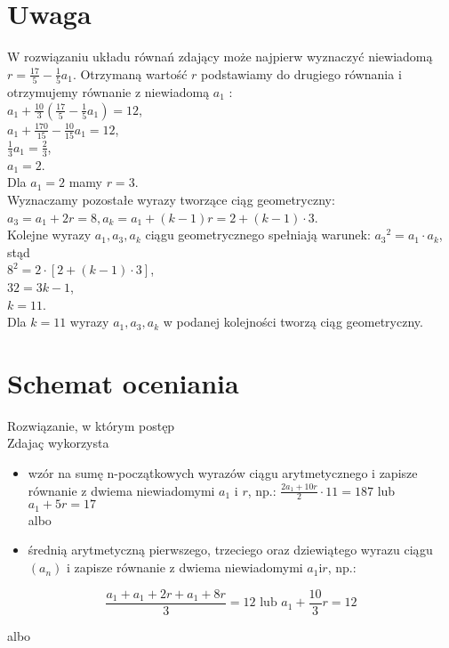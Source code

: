 \documentclass[10pt]{article}
\begin{document}
\section*{Uwaga}
W rozwiązaniu układu równań zdający może najpierw wyznaczyć niewiadomą $r=\frac{17}{5}-\frac{1}{5} a_{1}$. Otrzymaną wartość $r$ podstawiamy do drugiego równania i otrzymujemy równanie z niewiadomą $a_{1}$ :\\
$a_{1}+\frac{10}{3}\left(\frac{17}{5}-\frac{1}{5} a_{1}\right)=12$,\\
$a_{1}+\frac{170}{15}-\frac{10}{15} a_{1}=12$,\\
$\frac{1}{3} a_{1}=\frac{2}{3}$,\\
$a_{1}=2$.\\
Dla $a_{1}=2$ mamy $r=3$.\\
Wyznaczamy pozostałe wyrazy tworzące ciąg geometryczny:\\
$a_{3}=a_{1}+2 r=8, a_{k}=a_{1}+(k-1) r=2+(k-1) \cdot 3$.\\
Kolejne wyrazy $a_{1}, a_{3}, a_{k}$ ciągu geometrycznego spełniają warunek: $a_{3}{ }^{2}=a_{1} \cdot a_{k}$, stąd\\
$8^{2}=2 \cdot[2+(k-1) \cdot 3]$,\\
$32=3 k-1$,\\
$k=11$.\\
Dla $k=11$ wyrazy $a_{1}, a_{3}, a_{k}$ w podanej kolejności tworzą ciąg geometryczny.

\section*{Schemat oceniania}
Rozwiązanie, w którym postęp\\
Zdajaç wykorzysta

\begin{itemize}
  \item wzór na sumę n-początkowych wyrazów ciągu arytmetycznego i zapisze równanie z dwiema niewiadomymi $a_{1}$ i $r$, np.: $\frac{2 a_{1}+10 r}{2} \cdot 11=187$ lub $a_{1}+5 r=17$\\
albo
  \item średnią arytmetyczną pierwszego, trzeciego oraz dziewiątego wyrazu ciągu $\left(a_{n}\right)$ i zapisze równanie z dwiema niewiadomymi $a_{1} \mathrm{i} r$, np.:
\end{itemize}

$$
\frac{a_{1}+a_{1}+2 r+a_{1}+8 r}{3}=12 \text { lub } a_{1}+\frac{10}{3} r=12
$$

albo
\end{document}
